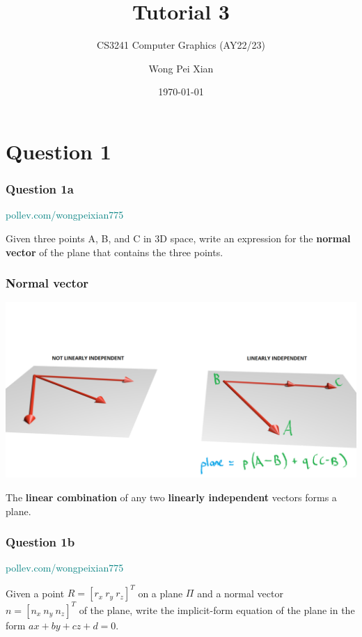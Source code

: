 \documentclass{beamer}
\title{Tutorial 3}
\subtitle{CS3241 Computer Graphics (AY22/23)}
\date{\today}
\author{Wong Pei Xian}
\institute[]{\email{e0389023@u.nus.edu}}
\begin{document}
\frame[plain]{\titlepage}

\section{Question 1}

\begin{frame}
    \frametitle{Question 1a}

    \begin{tcolorbox}[colback=teal!5!white]
        \textcolor{teal}{pollev.com/wongpeixian775}
    \end{tcolorbox}

    Given three points A, B, and C in 3D space, write an expression for the \textbf{normal vector}
    of the plane that contains the three points.
\end{frame}

\begin{frame}
    \frametitle{Normal vector}

    \begin{center}
        \includegraphics[scale=0.25]{1920px-Vec-dep.png}
    \end{center}

    The \textbf{linear combination} of any two \textbf{linearly independent} vectors forms a plane.

\end{frame}

\begin{frame}
    \frametitle{Question 1b}

    \begin{tcolorbox}[colback=teal!5!white]
        \textcolor{teal}{pollev.com/wongpeixian775}
    \end{tcolorbox}

    Given a point $R = [r_x \  r_y \  r_z]^T$ on a plane $\Pi$ and a normal vector 
    $n = [n_x \  n_y \  n_z]^T$ of the plane, write the implicit-form equation of 
    the plane in the form $ax + by + cz + d = 0$.

\end{frame}
\end{document}
